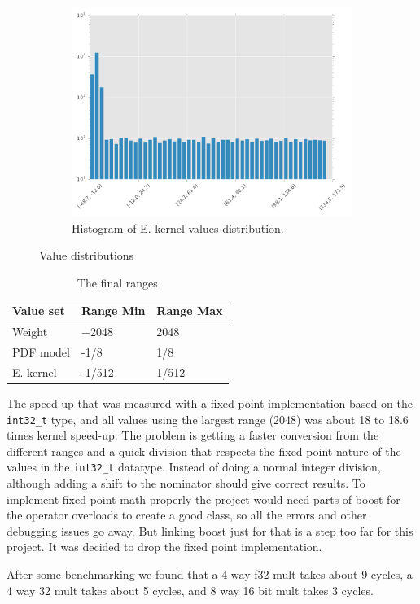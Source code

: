 \documentclass[final]{article}
\begin{document}
\begin{figure}[H]
\begin{subfigure}[b]{0.32\textwidth}
        \includegraphics[width=\textwidth]{resources/histogramE}
        \caption{Histogram of E. kernel values distribution.}
    \end{subfigure}
    \caption{Value distributions}
    \label{fig:value-distributions}
\end{figure}


\begin{table}[H]
    \centering
    \caption{The final ranges}
    \label{tab:final-ranges}
    \begin{tabular}{lll}
        \toprule
        \textbf{Value set} & \textbf{Range Min} & \textbf{Range Max} \\
        \midrule
        Weight      &  \num{-2048}  &  \num{2048}     \\
        PDF model   &  \num{-1/8}   &  \num{1/8}      \\
        E. kernel      &  \num{-1/512} &  \num{1/512}    \\
        \bottomrule
    \end{tabular}
\end{table}

The speed-up that was measured with a fixed-point implementation based on the \texttt{int32\_t} type, and all values using the largest range (\num{2048}) was about \num{18} to \num{18.6} times kernel speed-up.
The problem is getting a faster conversion from the different ranges and a quick division that respects the fixed point nature of the values in the \texttt{int32\_t} datatype.
Instead of doing a normal integer division, although adding a shift to the nominator should give correct results.
To implement fixed-point math properly the project would need parts of boost for the operator overloads to create a good class, so all the errors and other debugging issues go away.
But linking boost just for that is a step too far for this project.
It was decided to drop the fixed point implementation.

After some benchmarking we found that a 4 way f32 mult takes about 9 cycles, a 4 way 32 mult takes about 5 cycles, and 8 way 16 bit mult takes 3 cycles.
\end{document}
